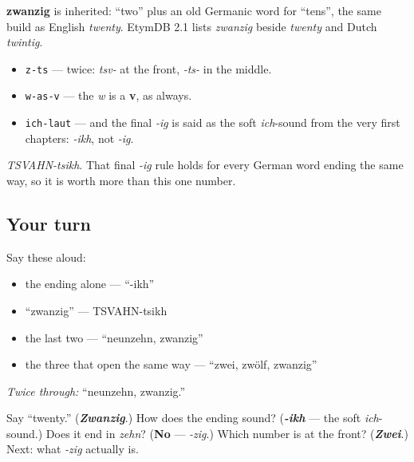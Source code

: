 \begin{cousinweb}
\textbf{zwanzig} is inherited: \textquotedblleft{}two\textquotedblright{} plus an old Germanic word for \textquotedblleft{}tens\textquotedblright{}, the same build as English \emph{twenty}. EtymDB 2.1 lists \emph{zwanzig} beside \emph{twenty} and Dutch \emph{twintig}.
\end{cousinweb}

\begin{sounds}
\begin{itemize}
\raggedright
  \item \texttt{z-ts} — twice: \emph{tsv-} at the front, \emph{-ts-} in the middle.
  \item \texttt{w-as-v} — the \emph{w} is a \textbf{v}, as always.
  \item \texttt{ich-laut} — and the final \emph{-ig} is said as the soft \emph{ich}-sound from the very first chapters: \emph{-ikh}, not \emph{-ig}.
\end{itemize}

\emph{TSVAHN-tsikh}. That final \emph{-ig} rule holds for every German word ending the same way, so it is worth more than this one number.
\end{sounds}

\subsection*{Your turn}
Say these aloud:

\begin{itemize}
\raggedright
  \item the ending alone — \textquotedblleft{}-ikh\textquotedblright{}
  \item \textquotedblleft{}zwanzig\textquotedblright{} — TSVAHN-tsikh
  \item the last two — \textquotedblleft{}neunzehn, zwanzig\textquotedblright{}
  \item the three that open the same way — \textquotedblleft{}zwei, zwölf, zwanzig\textquotedblright{}
\end{itemize}

\emph{Twice through:} \textquotedblleft{}neunzehn, zwanzig.\textquotedblright{}

\begin{tcolorbox}[breakable,colback=teal!4,colframe=teal!35!black,title={Before you move on}]
Say \textquotedblleft{}twenty.\textquotedblright{} (\emph{\textbf{Zwanzig}}.) How does the ending sound? (\emph{\textbf{-ikh}} — the soft \emph{ich}-sound.) Does it end in \emph{zehn}? (\textbf{No} — \emph{-zig}.) Which number is at the front? (\emph{\textbf{Zwei}}.) Next: what \emph{-zig} actually is.
\end{tcolorbox}
